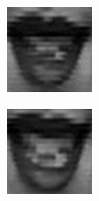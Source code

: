 \begin{figure}
\begin{subfigure}[b]{0.15\textwidth}
		\caption{}
		\label{fig:timeseriesHappy:d}
	\end{subfigure}
	\begin{subfigure}[b]{0.15\textwidth}
		\includegraphics[width=\textwidth]{./img/timeseriesHappy/S026_006_00000005.png}
		\caption{}
		\label{fig:timeseriesHappy:e}
	\end{subfigure}
	\begin{subfigure}[b]{0.15\textwidth}
		\includegraphics[width=\textwidth]{./img/timeseriesHappy/S026_006_00000006.png}

\end{subfigure}
\end{figure}
